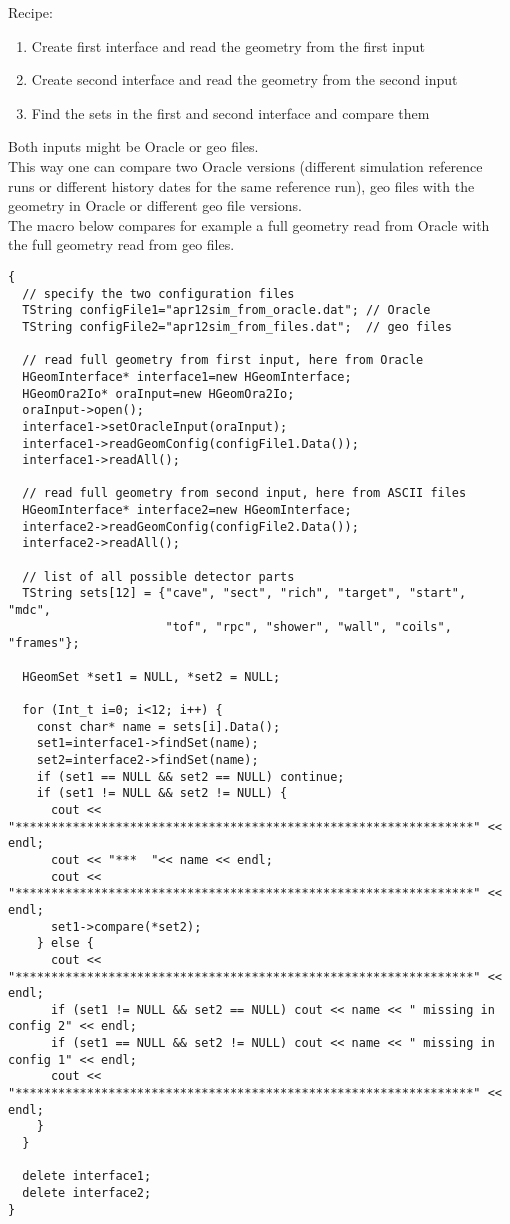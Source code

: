 Recipe:
\begin{enumerate}
 \setlength{\itemsep}{0pt}    
 \item Create first interface and read the geometry from the first input
 \item Create second interface and read the geometry from the second input
 \item Find the sets in the first and second interface and compare them
\end{enumerate}
Both inputs might be Oracle or geo files.\\
This way one can compare two Oracle versions (different simulation reference runs or different history dates for the same 
reference run), geo files with the geometry in Oracle or different geo file versions.\\

The macro below compares for example a full geometry read from Oracle with the full geometry read from geo files. 
\begin{lstlisting}
{
  // specify the two configuration files
  TString configFile1="apr12sim_from_oracle.dat"; // Oracle
  TString configFile2="apr12sim_from_files.dat";  // geo files      

  // read full geometry from first input, here from Oracle
  HGeomInterface* interface1=new HGeomInterface;
  HGeomOra2Io* oraInput=new HGeomOra2Io;
  oraInput->open();
  interface1->setOracleInput(oraInput);
  interface1->readGeomConfig(configFile1.Data());
  interface1->readAll();  

  // read full geometry from second input, here from ASCII files
  HGeomInterface* interface2=new HGeomInterface;
  interface2->readGeomConfig(configFile2.Data());
  interface2->readAll();  
  
  // list of all possible detector parts
  TString sets[12] = {"cave", "sect", "rich", "target", "start", "mdc",
                      "tof", "rpc", "shower", "wall", "coils", "frames"};

  HGeomSet *set1 = NULL, *set2 = NULL;

  for (Int_t i=0; i<12; i++) {
    const char* name = sets[i].Data();
    set1=interface1->findSet(name);
    set2=interface2->findSet(name);
    if (set1 == NULL && set2 == NULL) continue;
    if (set1 != NULL && set2 != NULL) {
      cout << "****************************************************************" << endl;
      cout << "***  "<< name << endl;
      cout << "****************************************************************" << endl;
      set1->compare(*set2);
    } else {
      cout << "****************************************************************" << endl;
      if (set1 != NULL && set2 == NULL) cout << name << " missing in config 2" << endl;
      if (set1 == NULL && set2 != NULL) cout << name << " missing in config 1" << endl;
      cout << "****************************************************************" << endl;
    }
  }

  delete interface1;
  delete interface2;
}
\end{lstlisting}

